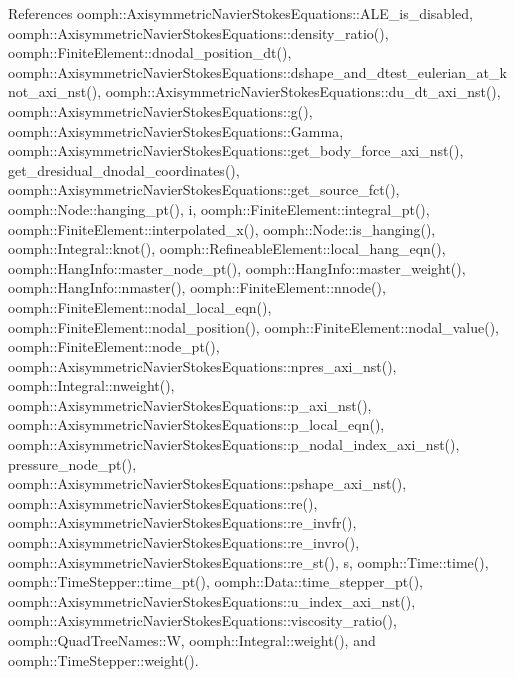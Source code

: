 References oomph\+::\+Axisymmetric\+Navier\+Stokes\+Equations\+::\+A\+L\+E\+\_\+is\+\_\+disabled, oomph\+::\+Axisymmetric\+Navier\+Stokes\+Equations\+::density\+\_\+ratio(), oomph\+::\+Finite\+Element\+::dnodal\+\_\+position\+\_\+dt(), oomph\+::\+Axisymmetric\+Navier\+Stokes\+Equations\+::dshape\+\_\+and\+\_\+dtest\+\_\+eulerian\+\_\+at\+\_\+knot\+\_\+axi\+\_\+nst(), oomph\+::\+Axisymmetric\+Navier\+Stokes\+Equations\+::du\+\_\+dt\+\_\+axi\+\_\+nst(), oomph\+::\+Axisymmetric\+Navier\+Stokes\+Equations\+::g(), oomph\+::\+Axisymmetric\+Navier\+Stokes\+Equations\+::\+Gamma, oomph\+::\+Axisymmetric\+Navier\+Stokes\+Equations\+::get\+\_\+body\+\_\+force\+\_\+axi\+\_\+nst(), get\+\_\+dresidual\+\_\+dnodal\+\_\+coordinates(), oomph\+::\+Axisymmetric\+Navier\+Stokes\+Equations\+::get\+\_\+source\+\_\+fct(), oomph\+::\+Node\+::hanging\+\_\+pt(), i, oomph\+::\+Finite\+Element\+::integral\+\_\+pt(), oomph\+::\+Finite\+Element\+::interpolated\+\_\+x(), oomph\+::\+Node\+::is\+\_\+hanging(), oomph\+::\+Integral\+::knot(), oomph\+::\+Refineable\+Element\+::local\+\_\+hang\+\_\+eqn(), oomph\+::\+Hang\+Info\+::master\+\_\+node\+\_\+pt(), oomph\+::\+Hang\+Info\+::master\+\_\+weight(), oomph\+::\+Hang\+Info\+::nmaster(), oomph\+::\+Finite\+Element\+::nnode(), oomph\+::\+Finite\+Element\+::nodal\+\_\+local\+\_\+eqn(), oomph\+::\+Finite\+Element\+::nodal\+\_\+position(), oomph\+::\+Finite\+Element\+::nodal\+\_\+value(), oomph\+::\+Finite\+Element\+::node\+\_\+pt(), oomph\+::\+Axisymmetric\+Navier\+Stokes\+Equations\+::npres\+\_\+axi\+\_\+nst(), oomph\+::\+Integral\+::nweight(), oomph\+::\+Axisymmetric\+Navier\+Stokes\+Equations\+::p\+\_\+axi\+\_\+nst(), oomph\+::\+Axisymmetric\+Navier\+Stokes\+Equations\+::p\+\_\+local\+\_\+eqn(), oomph\+::\+Axisymmetric\+Navier\+Stokes\+Equations\+::p\+\_\+nodal\+\_\+index\+\_\+axi\+\_\+nst(), pressure\+\_\+node\+\_\+pt(), oomph\+::\+Axisymmetric\+Navier\+Stokes\+Equations\+::pshape\+\_\+axi\+\_\+nst(), oomph\+::\+Axisymmetric\+Navier\+Stokes\+Equations\+::re(), oomph\+::\+Axisymmetric\+Navier\+Stokes\+Equations\+::re\+\_\+invfr(), oomph\+::\+Axisymmetric\+Navier\+Stokes\+Equations\+::re\+\_\+invro(), oomph\+::\+Axisymmetric\+Navier\+Stokes\+Equations\+::re\+\_\+st(), s, oomph\+::\+Time\+::time(), oomph\+::\+Time\+Stepper\+::time\+\_\+pt(), oomph\+::\+Data\+::time\+\_\+stepper\+\_\+pt(), oomph\+::\+Axisymmetric\+Navier\+Stokes\+Equations\+::u\+\_\+index\+\_\+axi\+\_\+nst(), oomph\+::\+Axisymmetric\+Navier\+Stokes\+Equations\+::viscosity\+\_\+ratio(), oomph\+::\+Quad\+Tree\+Names\+::W, oomph\+::\+Integral\+::weight(), and oomph\+::\+Time\+Stepper\+::weight().



